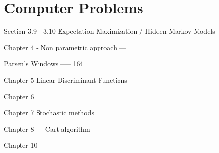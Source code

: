 \documentclass[11pt]{article}
\begin{document}
\section{Computer Problems }
	
	
Section 3.9 - 3.10 Expectation Maximization  / Hidden Markov Models

Chapter 4 - Non parametric approach   ---


Parsen's Windows ----- 164

Chapter 5  Linear Discriminant Functions ---- 

Chapter 6 

Chapter 7 Stochastic methods


Chapter 8  --- Cart algorithm  


Chapter 10   --- 




\end{document}
